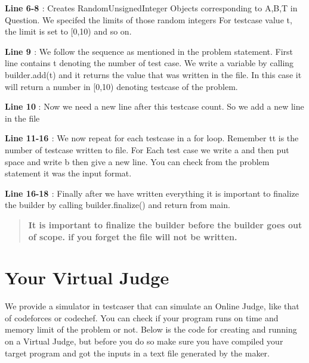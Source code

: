{\bfseries{Line 6-\/8 }} \+: Creates Random\+Unsigned\+Integer Objects corresponding to A,B,T in Question. We specifed the limits of those random integers For testcase value t, the limit is set to \mbox{[}0,10) and so on.

{\bfseries{Line 9 }} \+: We follow the sequence as mentioned in the problem statement. First line contains t denoting the number of test case. We write a variable by calling {\ttfamily builder.\+add(t)} and it returns the value that was written in the file. In this case it will return a number in \mbox{[}0,10) denoting testcase of the problem.

{\bfseries{Line 10}} \+: Now we need a new line after this testcase count. So we add a new line in the file

{\bfseries{Line 11-\/16 }} \+: We now repeat for each testcase in a for loop. Remember {\ttfamily tt} is the number of testcase written to file. For Each test case we write \textquotesingle{}a\textquotesingle{} and then put space and write \textquotesingle{}b\textquotesingle{} then give a new line. You can check from the problem statement it was the input format.

{\bfseries{Line 16-\/18 }} \+: Finally after we have written everything it is important to finalize the builder by calling {\ttfamily builder.\+finalize()} and return from main.

\begin{quote}
{\bfseries{It is important to finalize the builder before the builder goes out of scope. if you forget the file will not be written. }} \end{quote}


\hypertarget{index_virtual_judge}{}\section{Your Virtual Judge}\label{index_virtual_judge}
We provide a simulator in testcaser that can simulate an Online Judge, like that of codeforces or codechef. You can check if your program runs on time and memory limit of the problem or not. Below is the code for creating and running on a Virtual Judge, but before you do so make sure you have compiled your target program and got the inputs in a text file generated by the maker.


